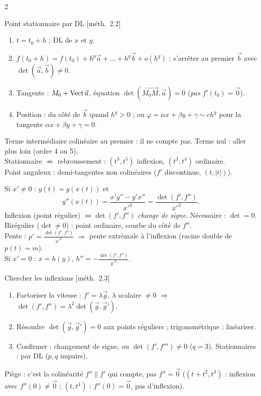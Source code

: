 \documentclass[a4paper,10pt]{article}
\newcommand{\vv}[1]{\overrightarrow{#1}}\newcommand{\ve}[1]{\vec{#1}}
\newcommand{\livre}[1]{{\sffamily\scriptsize\color{Gris}[#1]}}
\begin{document}
\begin{multicols}{2}
\begin{METH}{Point stationnaire par DL \livre{méth.~2.2}}
\begin{enumerate}
\item $t=t_0+h$ ; DL de $x$ et $y$.
\item $f(t_0+h)=f(t_0)+h^p\ve a+\dots+h^q\ve b+o(h^q)$ ; s'arrêter au premier $\ve b$ avec $\det(\ve a,\ve b)\neq0$.
\item Tangente : $M_0+\vect\ve a$, équation $\det(\vv{M_0M},\ve a)=0$ (\emph{pas} $f'(t_0)=\ve0$).
\item Position : du côté de $\ve b$ quand $h^q>0$ ; ou $\varphi=\alpha x+\beta y+\gamma\sim ch^q$ pour la tangente $\alpha x+\beta y+\gamma=0$.
\end{enumerate}
\end{METH}

\begin{PIEGE}
Terme intermédiaire colinéaire au premier : il ne compte pas. Terme nul : aller plus loin (ordre 4 ou 5).\\
Stationnaire $\not\Rightarrow$ rebroussement : $(t^3,t^5)$ inflexion, $(t^3,t^4)$ ordinaire.\\
Point anguleux : demi-tangentes non colinéaires ($f'$ discontinue, $(t,|t|)$).
\end{PIEGE}

\begin{FORM}[INFLEXION ET $\det(f',f'')$ \livre{§2.4}]
Si $x'\neq0$ : $y(t)=g(x(t))$ et
\[g''(x(t))=\frac{x'y''-y'x''}{x'^3}=\frac{\det(f',f'')}{x'^3}.\]
Inflexion (point régulier) $\iff\det(f',f'')$ \emph{change de signe}. Nécessaire : $\det=0$.\\
Birégulier ($\det\neq0$) : point ordinaire, courbe du côté de $f''$.\\
Pente : $p'=\frac{\det(f',f'')}{x'^2}$ $\Rightarrow$ pente extrémale à l'inflexion (racine double de $p(t)=m$).\\
Si $x'=0$ : $x=h(y)$, $h''=-\frac{\det(f',f'')}{y'^3}$.
\end{FORM}

\begin{METH}{Chercher les inflexions \livre{méth.~2.3}}
\begin{enumerate}
\item Factoriser la vitesse : $f'=\lambda\ve g$, $\lambda$ scalaire $\neq0$ $\Rightarrow$ $\det(f',f'')=\lambda^2\det(\ve g,\ve g')$.
\item Résoudre $\det(\ve g,\ve g')=0$ aux points réguliers ; trigonométrique : linéariser.
\item Confirmer : changement de signe, ou $\det(f',f''')\neq0$ ($q=3$). Stationnaires : par DL ($p,q$ impairs).
\end{enumerate}
Piège : c'est la colinéarité $f''\parallel f'$ qui compte, pas $f''=\ve0$ ($(t+t^2,t^3)$ : inflexion avec $f''(0)\neq\ve0$ ;
$(t,t^4)$ : $f''(0)=\ve0$, pas d'inflexion).
\end{METH}


\end{multicols}
\end{document}
